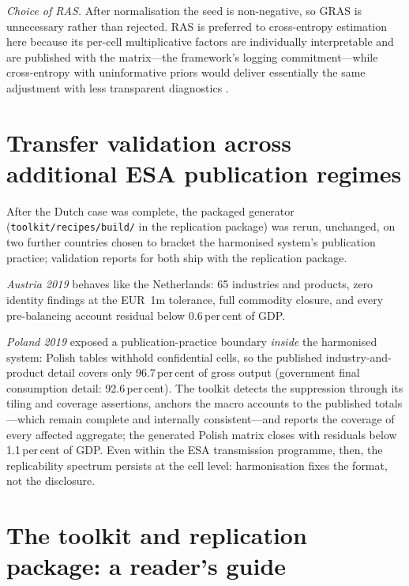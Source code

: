 \emph{Choice of RAS.} After normalisation the seed is non-negative, so
GRAS is unnecessary rather than rejected. RAS is preferred to
cross-entropy estimation here because its per-cell multiplicative
factors are individually interpretable and are published with the
matrix---the framework's logging commitment---while cross-entropy with
uninformative priors would deliver essentially the same adjustment with
less transparent diagnostics \citep{robinson2001}.

\section{Transfer validation across additional ESA publication regimes}
\label{app:transfer}

After the Dutch case was complete, the packaged generator
(\texttt{toolkit/recipes/build/} in the replication package) was rerun,
unchanged, on two further countries chosen to bracket the harmonised
system's publication practice; validation reports for both ship with the
replication package.

\emph{Austria 2019} behaves like the Netherlands: 65 industries and
products, zero identity findings at the EUR~1m tolerance, full commodity
closure, and every pre-balancing account residual below 0.6\,per\,cent
of GDP.

\emph{Poland 2019} exposed a publication-practice boundary \emph{inside}
the harmonised system: Polish tables withhold confidential cells, so the
published industry-and-product detail covers only 96.7\,per\,cent of
gross output (government final consumption detail: 92.6\,per\,cent). The
toolkit detects the suppression through its tiling and coverage
assertions, anchors the macro accounts to the published totals---which
remain complete and internally consistent---and reports the coverage of
every affected aggregate; the generated Polish matrix closes with
residuals below 1.1\,per\,cent of GDP. Even within the ESA transmission
programme, then, the replicability spectrum persists at the cell level:
harmonisation fixes the format, not the disclosure.

\section{The toolkit and replication package: a reader's guide}
\label{app:toolkit}

